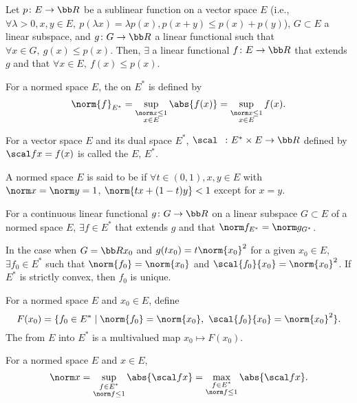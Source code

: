 \cite{brezis}
Let $p \colon E \to \bb R$ be a sublinear function on a vector space $E$ (i.e., $\forall \lambda > 0, x, y \in E,\ p(\lambda x) = \lambda p(x), p(x+y) \le p(x) + p(y)$), $G \subset E$ a linear subspace, and $g \colon G \to \bb R$ a linear functional such that $\forall x \in G,\ g(x) \le p(x)$. Then, $\exists$ a linear functional $f \colon E \to \bb R$ that extends $g$ and that $\forall x \in E,\ f(x) \le p(x)$.

For a normed space $E$, the  on $E^*$ is defined by
\[
  \norm{f}_{E^*} = \sup_{\substack{\norm x \le 1 \\ x \in E}} \abs{f(x)} = \sup_{\substack{\norm x \le 1 \\ x \in E}} f(x).
\]

For a vector space $E$ and its dual space $E^*$, $\scal\ \  \colon E^* \times E \to \bb R$ defined by $\scal fx = f(x)$ is called the  $E$, $E^*$.

A normed space $E$ is said to be  if $\forall t \in (0, 1), x, y \in E$ with $\norm x = \norm y = 1$, $\norm{tx + (1-t)y} < 1$ except for $x = y$.

For a continuous linear functional $g \colon G \to \bb R$ on a linear subspace $G \subset E$ of a normed space $E$, $\exists f \in E^*$ that extends $g$ and that $\norm f_{E^*} = \norm g_{G^*}$.

In the case when $G = \bb R x_0$ and $g(tx_0) = t \norm{x_0}^2$ for a given $x_0 \in E$, $\exists f_0 \in E^*$ such that $\norm{f_0} = \norm{x_0}$ and $\scal{f_0}{x_0} = \norm{x_0}^2$. If $E^*$ is strictly convex, then $f_0$ is unique.

For a normed space $E$ and $x_0 \in E$, define
\[
  F(x_0) = \{ f_0 \in E^* \mid \norm{f_0} = \norm{x_0},\ \scal{f_0}{x_0} = \norm{x_0}^2 \}.
\]
The  from $E$ into $E^*$ is a multivalued map $x_0 \mapsto F(x_0)$.

For a normed space $E$ and $x \in E$,
\[
  \norm x = \sup_{\substack{f \in E^* \\ \norm f \le 1}} \abs{\scal fx} = \max_{\substack{f \in E^* \\ \norm f \le 1}} \abs{\scal fx}.
\]

